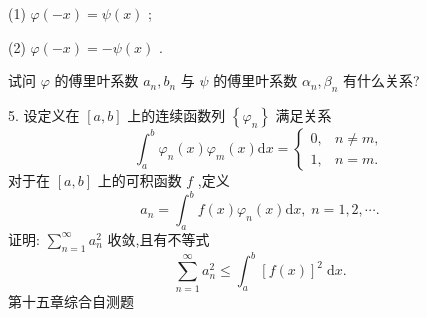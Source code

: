 (1) \(\varphi \left( {-x}\right)  = \psi \left( x\right)\) ;

(2) \(\varphi \left( {-x}\right)  =  - \psi \left( x\right)\) .

试问 \(\varphi\) 的傅里叶系数 \({a}_{n},{b}_{n}\) 与 \(\psi\) 的傅里叶系数 \({\alpha }_{n},{\beta }_{n}\) 有什么关系?

5. 设定义在 \(\left\lbrack  {a,b}\right\rbrack\) 上的连续函数列 \(\left\{  {\varphi }_{n}\right\}\) 满足关系
\[
{\int }_{a}^{b}{\varphi }_{n}\left( x\right) {\varphi }_{m}\left( x\right) \mathrm{d}x = \left\{  \begin{array}{ll} 0, & n \neq  m, \\  1, & n = m. \end{array}\right.
\]
对于在 \(\left\lbrack  {a,b}\right\rbrack\) 上的可积函数 \(f\) ,定义
\[
{a}_{n} = {\int }_{a}^{b}f\left( x\right) {\varphi }_{n}\left( x\right) \mathrm{d}x,\;n = 1,2,\cdots .
\]
证明: \(\mathop{\sum }\limits_{{n = 1}}^{\infty }{a}_{n}^{2}\) 收敛,且有不等式
\[
\mathop{\sum }\limits_{{n = 1}}^{\infty }{a}_{n}^{2} \leq  {\int }_{a}^{b}{\left\lbrack  f\left( x\right) \right\rbrack  }^{2}\mathrm{\;d}x.
\]
第十五章综合自测题


